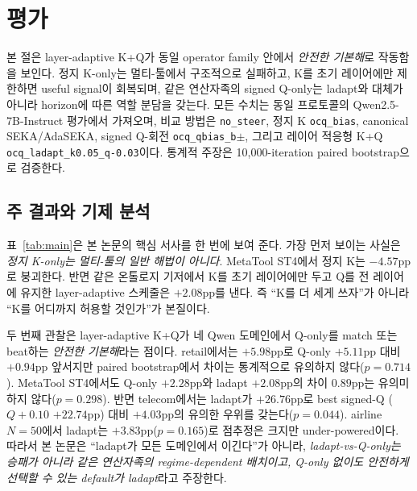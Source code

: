 \section{평가}\label{sec:experiments}

본 절은 layer-adaptive K+Q가 동일 operator family 안에서 \emph{안전한 기본해}로 작동함을 보인다. 정지 K-only는 멀티-툴에서 구조적으로 실패하고, K를 초기 레이어에만 제한하면 useful signal이 회복되며, 같은 연산자족의 signed Q-only는 ladapt와 대체가 아니라 horizon에 따른 역할 분담을 갖는다. 모든 수치는 동일 프로토콜의 Qwen2.5-7B-Instruct 평가에서 가져오며, 비교 방법은 \texttt{no\_steer}, 정지 K \texttt{ocq\_bias}, canonical SEKA/AdaSEKA, signed Q-회전 \texttt{ocq\_qbias\_b$\pm$}, 그리고 레이어 적응형 K+Q \texttt{ocq\_ladapt\_k0.05\_q-0.03}이다. 통계적 주장은 10{,}000-iteration paired bootstrap으로 검증한다.

\subsection{주 결과와 기제 분석}\label{sec:exp:main}

표~\ref{tab:main}은 본 논문의 핵심 서사를 한 번에 보여 준다. 가장 먼저 보이는 사실은 \emph{정지 K-only는 멀티-툴의 일반 해법이 아니다}. MetaTool ST4에서 정지 K는 $-4.57$pp로 붕괴한다. 반면 같은 온톨로지 기저에서 K를 초기 레이어에만 두고 Q를 전 레이어에 유지한 layer-adaptive 스케줄은 $+2.08$pp를 낸다. 즉 ``K를 더 세게 쓰자''가 아니라 ``K를 어디까지 허용할 것인가''가 본질이다.

두 번째 관찰은 layer-adaptive K+Q가 네 Qwen 도메인에서 Q-only를 match 또는 beat하는 \emph{안전한 기본해}라는 점이다. retail에서는 $+5.98$pp로 Q-only $+5.11$pp 대비 $+0.94$pp 앞서지만 paired bootstrap에서 차이는 통계적으로 유의하지 않다($p=0.714$). MetaTool ST4에서도 Q-only $+2.28$pp와 ladapt $+2.08$pp의 차이 $0.89$pp는 유의미하지 않다($p=0.298$). 반면 telecom에서는 ladapt가 $+26.76$pp로 best signed-Q ($Q{+}0.10$ $+22.74$pp) 대비 $+4.03$pp의 유의한 우위를 갖는다($p=0.044$). airline $N{=}50$에서 ladapt는 $+3.83$pp($p=0.165$)로 점추정은 크지만 under-powered이다. 따라서 본 논문은 ``ladapt가 모든 도메인에서 이긴다''가 아니라, \emph{ladapt-vs-Q-only는 승패가 아니라 같은 연산자족의 regime-dependent 배치이고, Q-only 없이도 안전하게 선택할 수 있는 default가 ladapt}라고 주장한다.

